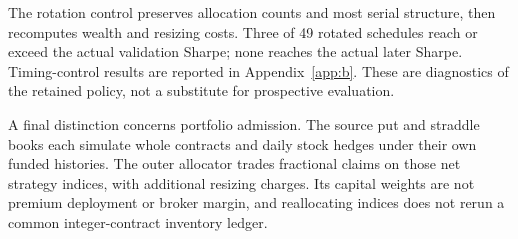 The rotation control preserves allocation counts and most serial structure, then recomputes wealth and resizing costs. Three of 49 rotated schedules reach or exceed the actual validation Sharpe; none reaches the actual later Sharpe. Timing-control results are reported in Appendix~\ref{app:b}. These are diagnostics of the retained policy, not a substitute for prospective evaluation.


A final distinction concerns portfolio admission. The source put and straddle books each simulate whole contracts and daily stock hedges under their own funded histories. The outer allocator trades fractional claims on those net strategy indices, with additional resizing charges. Its capital weights are not premium deployment or broker margin, and reallocating indices does not rerun a common integer-contract inventory ledger.


\FloatBarrier
